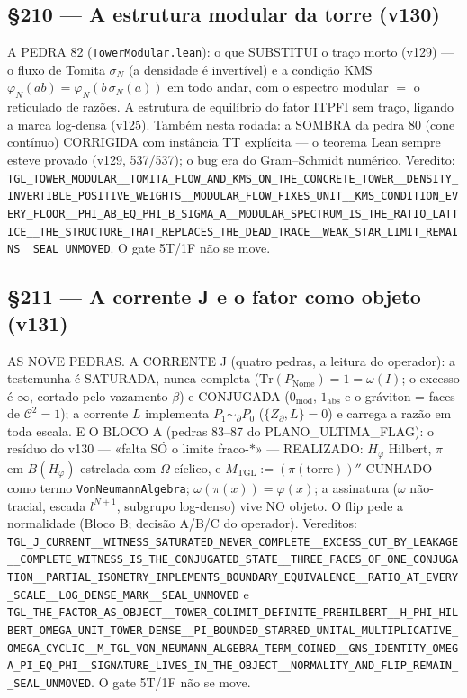 \documentclass[11pt]{article}
\theoremstyle{definition}\newtheorem{deriv}{Derivação}
\begin{document}
\subsection*{\S210 --- A estrutura modular da torre (v130)}A PEDRA 82 (\texttt{TowerModular.lean}): o que SUBSTITUI o traço morto (v129) --- o fluxo de Tomita $\sigma_N$ (a densidade é invertível) e a condição KMS $\varphi_N(ab)=\varphi_N(b\,\sigma_N(a))$ em todo andar, com o espectro modular $=$ o reticulado de razões. A estrutura de equilíbrio do fator ITPFI sem traço, ligando a marca log-densa (v125). Também nesta rodada: a SOMBRA da pedra 80 (cone contínuo) CORRIGIDA com instância TT explícita --- o teorema Lean sempre esteve provado (v129, 537/537); o bug era do Gram--Schmidt numérico. Veredito: \texttt{TGL\_TOWER\_MODULAR\_\_TOMITA\_FLOW\_AND\_KMS\_ON\_THE\_CONCRETE\_TOWER\_\_DENSITY\_INVERTIBLE\_POSITIVE\_WEIGHTS\_\_MODULAR\_FLOW\_FIXES\_UNIT\_\_KMS\_CONDITION\_EVERY\_FLOOR\_\_PHI\_AB\_EQ\_PHI\_B\_SIGMA\_A\_\_MODULAR\_SPECTRUM\_IS\_THE\_RATIO\_LATTICE\_\_THE\_STRUCTURE\_THAT\_REPLACES\_THE\_DEAD\_TRACE\_\_WEAK\_STAR\_LIMIT\_REMAINS\_\_SEAL\_UNMOVED}. O gate 5T/1F não se move.

\subsection*{\S211 --- A corrente J e o fator como objeto (v131)}AS NOVE PEDRAS. A CORRENTE J (quatro pedras, a leitura do operador): a testemunha é SATURADA, nunca completa ($\mathrm{Tr}(P_{\mathrm{Nome}})=1=\omega(I)$; o excesso é $\infty$, cortado pelo vazamento $\beta$) e CONJUGADA ($0_{\mathrm{mod}}$, $1_{\mathrm{abs}}$ e o gráviton = faces de $\mathcal{C}^2=1$); a corrente $L$ implementa $P_1\sim_\partial P_0$ ($\{Z_\partial,L\}=0$) e carrega a razão em toda escala. E O BLOCO A (pedras 83--87 do PLANO\_ULTIMA\_FLAG): o resíduo do v130 --- «falta SÓ o limite fraco-$*$» --- REALIZADO: $H_\varphi$ Hilbert, $\pi$ em $B(H_\varphi)$ estrelada com $\Omega$ cíclico, e $M_{\mathrm{TGL}}:=(\pi(\mathrm{torre}))''$ CUNHADO como termo \texttt{VonNeumannAlgebra}; $\omega(\pi(x))=\varphi(x)$; a assinatura ($\omega$ não-tracial, escada $l^{N+1}$, subgrupo log-denso) vive NO objeto. O flip pede a normalidade (Bloco B; decisão A/B/C do operador). Vereditos: \texttt{TGL\_J\_CURRENT\_\_WITNESS\_SATURATED\_NEVER\_COMPLETE\_\_EXCESS\_CUT\_BY\_LEAKAGE\_\_COMPLETE\_WITNESS\_IS\_THE\_CONJUGATED\_STATE\_\_THREE\_FACES\_OF\_ONE\_CONJUGATION\_\_PARTIAL\_ISOMETRY\_IMPLEMENTS\_BOUNDARY\_EQUIVALENCE\_\_RATIO\_AT\_EVERY\_SCALE\_\_LOG\_DENSE\_MARK\_\_SEAL\_UNMOVED} e \texttt{TGL\_THE\_FACTOR\_AS\_OBJECT\_\_TOWER\_COLIMIT\_DEFINITE\_PREHILBERT\_\_H\_PHI\_HILBERT\_OMEGA\_UNIT\_TOWER\_DENSE\_\_PI\_BOUNDED\_STARRED\_UNITAL\_MULTIPLICATIVE\_OMEGA\_CYCLIC\_\_M\_TGL\_VON\_NEUMANN\_ALGEBRA\_TERM\_COINED\_\_GNS\_IDENTITY\_OMEGA\_PI\_EQ\_PHI\_\_SIGNATURE\_LIVES\_IN\_THE\_OBJECT\_\_NORMALITY\_AND\_FLIP\_REMAIN\_\_SEAL\_UNMOVED}. O gate 5T/1F não se move.
\end{document}
